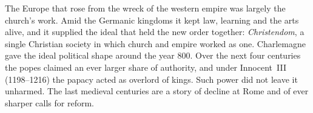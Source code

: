 \begin{partoverview}
The Europe that rose from the wreck of the western empire was largely the church's work. Amid the
Germanic kingdoms it kept law, learning and the arts alive, and it supplied the ideal that held the new
order together: \emph{Christendom}, a single Christian society in which church and empire worked as
one. Charlemagne gave the ideal political shape around the year 800. Over the next four centuries the
popes claimed an ever larger share of authority, and under Innocent~III (1198--1216) the papacy acted
as overlord of kings. Such power did not leave it unharmed. The last medieval centuries are a story of
decline at Rome and of ever sharper calls for reform.
\end{partoverview}
